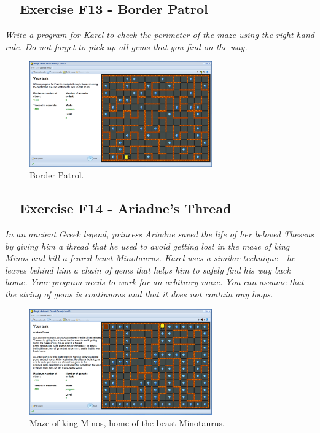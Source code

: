 \documentclass[article,A4,12pt]{llncs}
\begin{document}
{{{{\subsection{\ \ Exercise F13 - Border Patrol}

{\em Write a program for Karel to check the perimeter of the maze using the 
right-hand rule. Do not forget to pick up all gems that you find on the way.}

\begin{figure}[!ht]
\begin{center}
\includegraphics[width=0.7\textwidth]{img/g08.png}
\end{center}
\vspace{-4mm}
\caption{Border Patrol.}
\label{fig:g08}
\vspace{-10mm}
\end{figure}
\noindent

\subsection{\ \ Exercise F14 - Ariadne's Thread}

{\em In an ancient Greek legend, princess Ariadne saved the life of her 
beloved Theseus by giving him a thread that he used to avoid getting lost 
in the maze of king Minos and kill a feared beast Minotaurus. Karel uses 
a similar technique - he leaves behind him a chain of gems that helps him 
to safely find his way back home. Your program needs to work for an 
arbitrary maze. You can assume that the string of gems is continuous 
and that it does not contain any loops.}

\begin{figure}[!ht]
\begin{center}
\includegraphics[width=0.7\textwidth]{img/g09.png}
\end{center}
\vspace{-4mm}
\caption{Maze of king Minos, home of the beast Minotaurus.}
\label{fig:g09}
\end{figure}
\noindent

}}}}
\end{document}
